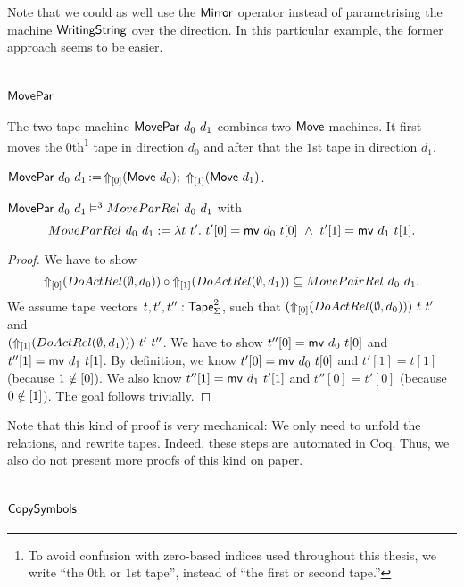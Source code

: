 Note that we could as well use the $\MS{Mirror}$ operator instead of parametrising the machine $\MS{WritingString}$ over the direction.  In this
particular example, the former approach seems to be easier.

\section{$\MS{MovePar}$}
\label{sec:MovePar}
%

The two-tape machine $\MS{MovePar}~d_0~d_1$ combines two $\MS{Move}$ machines.  It first moves the $0$th\footnote{To avoid confusion with zero-based
  indices used throughout this thesis, we write ``the $0$th or $1$st tape'', instead of ``the first or second tape.''} tape in direction $d_0$ and
after that the $1$st tape in direction $d_1$.
\begin{definition}[$\MS{MovePar}$][MovePar]
  \label{def:MovePar}
  $\MS{MovePar}~d_0~d_1 \defop \LiftTapes{(\MS{Move}~d_0)}{\Vector{0}} \Seq \LiftTapes{(\MS{Move}~d_1)}{\Vector{1}}$.
\end{definition}
\begin{lemma}
  \label{lem:MovePar_Sem}
  $\MS{MovePar}~d_0~d_1 \RealiseIn3 MoveParRel~d_0~d_1$ with
  \[ MoveParRel~d_0~d_1 := \lambda t~t'.~t'[0]=\MS{mv}~d_0~t[0] ~\land~ t'[1]=\MS{mv}~d_1~t[1]. \]
\end{lemma}
\begin{proof}
  We have to show
  $$
    \LiftTapes{(DoActRel(\None,d_0))}{\Vector{0}} \circ
    \LiftTapes{(DoActRel(\None,d_1))}{\Vector{1}} \subseteq
    MovePairRel~d_0~d_1.
  $$
  We assume tape vectors $t, t', t'' : \Tape_\Sigma^2$, such that $(\LiftTapes{(DoActRel(\None,d_0))}{\Vector{0}})~t~t'$ and \\
  $(\LiftTapes{(DoActRel(\None,d_1))}{\Vector{1}})~t'~t''$.  We have to show $t''[0]=\MS{mv}~d_0~t[0]$ and $t''[1]=\MS{mv}~d_1~t[1]$.  By definition,
  we know $t'[0]=\MS{mv}~d_0~t[0]$ and $t'[1]=t[1]$ (because $1 \notin \Vector{0}$).  We also know $t''[1]=\MS{mv}~d_1~t'[1]$ and $t''[0]=t'[0]$
  (because $0 \notin \Vector{1}$).  The goal follows trivially.
\end{proof}
Note that this kind of proof is very mechanical: We only need to unfold the relations, and rewrite tapes.  Indeed, these steps are automated in Coq.
Thus, we also do not present more proofs of this kind on paper.

\section{$\MS{CopySymbols}$}
\label{sec:CopySymbols}
%

